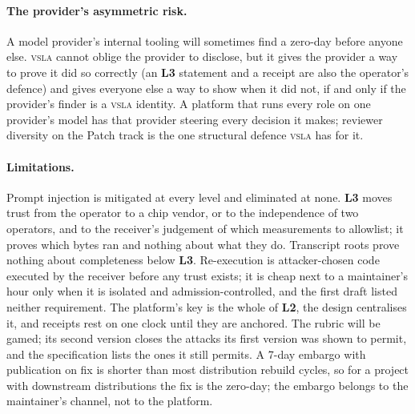 \documentclass[11pt]{article}
\newcommand{\vsla}{\textsc{vsla}}
\newcommand{\lvl}[1]{\textbf{L#1}}
\begin{document}
\paragraph{The provider's asymmetric risk.} A model provider's internal tooling will sometimes find a zero-day
before anyone else. \vsla{} cannot oblige the provider to disclose, but it gives the provider a way to prove it
did so correctly (an \lvl{3} statement and a receipt are also the operator's defence) and gives everyone else
a way to show when it did not, if and only if the provider's finder is a \vsla{} identity. A platform that runs
every role on one provider's model has that provider steering every decision it makes; reviewer diversity on
the Patch track is the one structural defence \vsla{} has for it.

\paragraph{Limitations.} Prompt injection is mitigated at every level and eliminated at none. \lvl{3} moves
trust from the operator to a chip vendor, or to the independence of two operators, and to the receiver's
judgement of which measurements to allowlist; it proves which bytes ran and nothing about what they do.
Transcript roots prove nothing about completeness below \lvl{3}. Re-execution is attacker-chosen code executed
by the receiver before any trust exists; it is cheap next to a maintainer's hour only when it is isolated and
admission-controlled, and the first draft listed neither requirement. The platform's key is the whole of
\lvl{2}, the design centralises it, and receipts rest on one clock until they are anchored. The rubric will be
gamed; its second version closes the attacks its first version was shown to permit, and the specification
lists the ones it still permits. A 7-day embargo with publication on fix is shorter than most distribution
rebuild cycles, so for a project with downstream distributions the fix is the zero-day; the embargo belongs to
the maintainer's channel, not to the platform.
\end{document}
